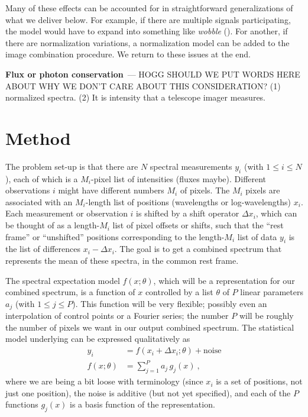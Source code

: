 \documentclass[modern]{aastex631}
\renewcommand{\paragraph}[1]{\medskip\par\noindent\textbf{#1}~---}
\begin{document}
Many of these effects can be accounted for in straightforward generalizations of what we deliver below.
For example, if there are multiple signals participating, the model would have to expand into something like \textsl{wobble} (\citealt{wobble}).
For another, if there are normalization variations, a normalization model can be added to the image combination procedure.
We return to these issues at the end. %

\paragraph{Flux or photon conservation}
HOGG SHOULD WE PUT WORDS HERE ABOUT WHY WE DON'T CARE ABOUT THIS CONSIDERATION? (1) normalized spectra. (2) It is intensity that a telescope imager measures.

\section{Method}\label{sec:method}

The problem set-up is that there are $N$ spectral measurements $y_i$ (with $1\leq i\leq N$), each of which is a $M_i$-pixel list of intensities (fluxes maybe).
Different observations $i$ might have different numbers $M_i$ of pixels.
The $M_i$ pixels are associated with an $M_i$-length list of positions (wavelengths or log-wavelengths) $x_i$.
Each measurement or observation $i$ is shifted by a shift operator $\Delta x_i$, which can be thought of as a length-$M_i$ list of pixel offsets or shifts, such that the ``rest frame'' or ``unshifted'' positions corresponding to the length-$M_i$ list of data $y_i$ is the list of differences $x_i - \Delta x_i$.
The goal is to get a combined spectrum that represents the mean of these spectra, in the common rest frame.

The spectral expectation model $f(x;\theta)$, which will be a representation for our combined spectrum, is a function of $x$ controlled by a list $\theta$ of $P$ linear parameters $a_j$ (with $1\leq j\leq P$).
This function will be very flexible; possibly even an interpolation of control points or a Fourier series; the number $P$ will be roughly the number of pixels we want in our output combined spectrum.
The statistical model underlying can be expressed qualitatively as
\begin{align}
    y_i &= f(x_i + \Delta x_i;\theta) + \mbox{noise} \\
    f(x;\theta) &= \sum_{j=1}^P a_j\,g_j(x) ~,
\end{align}
where we are being a bit loose with terminology (since $x_i$ is a set of positions, not just one position), the noise is additive (but not yet specified), and each of the $P$ functions $g_j(x)$ is a basis function of the representation.
\end{document}
